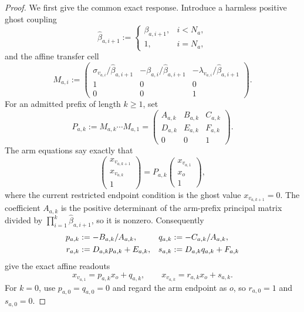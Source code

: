 \begin{proof}
We first give the common exact response.  Introduce a harmless positive ghost
coupling
\begin{equation*}
 \widehat\beta_{a,i+1}
 :=\begin{cases}
     \beta_{a,i+1},&i<N_a,\\
     1,&i=N_a,
   \end{cases}
\end{equation*}
and the affine transfer cell
\begin{equation}
 M_{a,i}
 :=
 \begin{pmatrix}
  \sigma_{v_{a,i}}/\widehat\beta_{a,i+1}
    &-\beta_{a,i}/\widehat\beta_{a,i+1}
    &-\lambda_{v_{a,i}}/\widehat\beta_{a,i+1}\\
  1&0&0\\
  0&0&1
 \end{pmatrix}.
 \label{eq:spider-transfer-cell}
\end{equation}
For an admitted prefix of length $k\geq1$, set
\begin{equation}
 P_{a,k}:=M_{a,k}\cdots M_{a,1}
 =
 \begin{pmatrix}
  A_{a,k}&B_{a,k}&C_{a,k}\\
  D_{a,k}&E_{a,k}&F_{a,k}\\
  0&0&1
 \end{pmatrix}.
 \label{eq:spider-transfer-product}
\end{equation}
The arm equations say exactly that
\begin{equation*}
 \begin{pmatrix}x_{v_{a,k+1}}\\x_{v_{a,k}}\\1\end{pmatrix}
 =P_{a,k}
  \begin{pmatrix}x_{v_{a,1}}\\x_o\\1\end{pmatrix},
\end{equation*}
where the current restricted endpoint condition is the ghost value
$x_{v_{a,k+1}}=0$.  The coefficient $A_{a,k}$ is the positive determinant of
the arm-prefix principal matrix divided by
$\prod_{i=1}^k\widehat\beta_{a,i+1}$, so it is nonzero.  Consequently
\begin{align}
 p_{a,k}&:=-B_{a,k}/A_{a,k},
 &q_{a,k}&:=-C_{a,k}/A_{a,k},\notag\\
 r_{a,k}&:=D_{a,k}p_{a,k}+E_{a,k},
 &s_{a,k}&:=D_{a,k}q_{a,k}+F_{a,k}
 \label{eq:spider-affine-arm-response}
\end{align}
give the exact affine readouts
\begin{equation*}
 x_{v_{a,1}}=p_{a,k}x_o+q_{a,k},
 \qquad
 x_{v_{a,k}}=r_{a,k}x_o+s_{a,k}.
\end{equation*}
For $k=0$, use $p_{a,0}=q_{a,0}=0$ and regard the arm endpoint as $o$, so
$r_{a,0}=1$ and $s_{a,0}=0$.


\end{proof}
